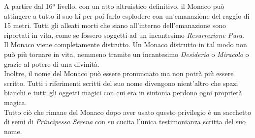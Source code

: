 A partire dal 16° livello, con un atto altruistico definitivo, il Monaco può attingere a tutto il suo ki per poi farlo esplodere con un'emanazione del raggio di 15 metri. Tutti gli alleati morti che siano all'interno dell'emanazione sono riportati in vita, come se fossero soggetti ad un incantesimo \textit{Resurrezione Pura}. \\ Il Monaco viene completamente distrutto. Un Monaco distrutto in tal modo non può più tornare in vita, nemmeno tramite un incantesimo \textit{Desiderio} o \textit{Miracolo} o grazie al potere di una divinità. \\ Inoltre, il nome del Monaco può essere pronunciato ma non potrà più essere scritto. Tutti i riferimenti scritti del suo nome divengono nient'altro che spazi bianchi e tutti gli oggetti magici con cui era in sintonia perdono ogni proprietà magica. \\ Tutto ciò che rimane del Monaco dopo aver usato questo privilegio è un sacchetto di semi di \textit{Principessa Serena} con su cucita l'unica testimonianza scritta del suo nome.

